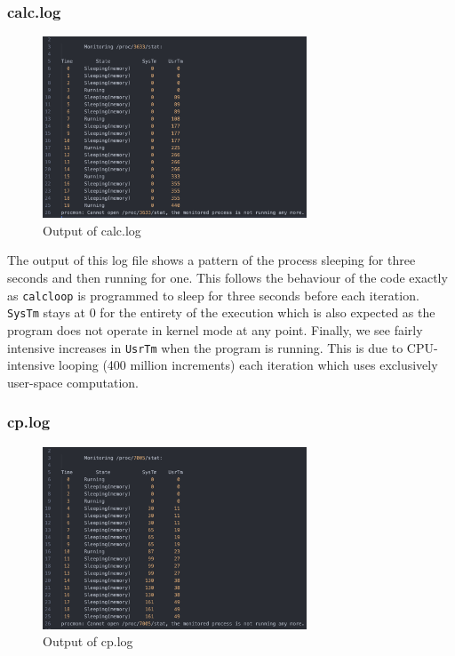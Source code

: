 \documentclass[12pt]{article}
\begin{document}
\subsubsection{calc.log}
\begin{figure}[H]
    \centering
    \includegraphics[width=0.7\textwidth]{../../screenshots/calclog}
    \caption{Output of calc.log}
    \label{fig:calc-log}
\end{figure}
\noindent
The output of this log file shows a pattern of the process
sleeping for three seconds and then running for one.
This follows the behaviour of the code exactly as \texttt{calcloop}
is programmed to sleep for three seconds before each iteration.
\texttt{SysTm} stays at 0 for the entirety of the execution which is also
expected as the program does not operate in kernel mode at any point.
Finally, we see fairly intensive increases in \texttt{UsrTm} when the program is running.
This is due to CPU-intensive looping (400 million increments) each iteration which uses
exclusively user-space computation.

\subsubsection{cp.log}
\begin{figure}[H]
    \centering
    \includegraphics[width=0.7\textwidth]{../../screenshots/cplog}
    \caption{Output of cp.log}
    \label{fig:cp-log}
\end{figure}
\end{document}
